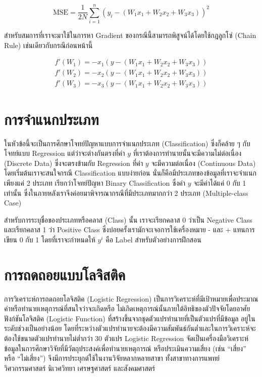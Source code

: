 \begin{equation}
    \text{MSE} = \frac{1}{2N} \sum_{i=1}^{n} (y_i - (W_1 x_1 + W_2 x_2 + W_3 x_3))^2
\end{equation}

สำหรับสมการที่เราจะมาใช้ในการหา Gradient ของกรณีนี้สามารถพิสูจน์ได้โดยใช้กฎลูกโซ่ (Chain Rule) เช่นเดียวกับกรณีก่อนหน้านี้

\begin{align}
    f'(W_1) = -x_1(y - (W_1 x_1 + W_2 x_2 + W_3 x_3)) \\
    f'(W_2) = -x_2(y - (W_1 x_1 + W_2 x_2 + W_3 x_3)) \\
    f'(W_3) = -x_3(y - (W_1 x_1 + W_2 x_2 + W_3 x_3))
\end{align}

\section{การจำแนกประเภท}
\label{sec:classification}

ในหัวข้อนี้จะเป็นการศึกษาโจทย์ปัญหาแบบการจำแนกประเภท (Classification) ซึ่งก็คล้าย ๆ กับโจทย์แบบ Regression แต่ว่าจะต่างกันตรงที่ค่า
$y$ ที่เราต้องการทำนายนั้นจะมีความไม่ต่อเนื่อง (Discrete Data) ซึ่งจะตรงข้ามกับ Regression ที่ค่า $y$ จะมีความต่อเนื่อง (Continuous 
Data) โดยเริ่มต้นเราจะสนใจกรณี Classification แบบง่ายก่อน นั่นก็คือมีประเภทของข้อมูลที่เราจะจำแนกเพียงแค่ 2 ประเภท เรียกว่าโจทย์ปัญหา 
Binary Classification ซึ่งค่า $y$ จะมีค่าได้แค่ 0 กับ 1 เท่านั้น ซึ่งในภายหลังเราจึงค่อยมาพิจารณากรณีที่มีประเภทมากกว่า 2 ประเภท
(Multiple-class Case) 

สำหรับการระบุชื่อของประเภทหรือคลาส (Class) นั้น เราจะเรียกคลาส 0 ว่าเป็น Negative Class และเรียกคลาส 1 ว่า Positive Class
ซึ่งบ่อยครั้งเรามักจะเจอการใช้เครื่องหมาย - และ + แทนการเขียน 0 กับ 1 โดยที่เราจะกำหนดให้ $y^{i}$ คือ Label สำหรับตัวอย่างการฝึกสอน

\section{การถดถอยแบบโลจิสติค}
\label{sec:logis_regress}

การวิเคราะห์การถดถอยโลจิสติค (Logistic Regression) เป็นการวิเคราะห์ที่มีเป้าหมายเพื่อประมาณค่าหรือทํานายเหตุการณ์ที่สนใจว่าจะเกิดหรือ%
ไม่เกิดเหตุการณ์นั้นภายใต้อิทธิของตัวปัจจัยโดยอาศัยฟังก์ชันโลจิสติค (Logistic Function) ที่สร้างขึ้นจากชุดตัวแปรทำนายที่เป็นตัวแปรที่มีข้อมูล%
อยู่ในระดับช่วงเป็นอย่างน้อย โดยที่ระหว่างตัวแปรทำนายจะต้องมีความสัมพันธ์กันต่ำและในการวิเคราะห์จะต้องใช้ขนาดตัวแปรทำนายไม่ต่ำกว่า 30 
ตัวแปร Logistic Regression จัดเป็นเครื่องมือวิเคราะห์ข้อมูลในการศึกษาวิจัยที่มีวัตถุประสงค์เพื่อทํานายเหตุการณ์ หรือประเมินความเสี่ยง (เช่น 
\enquote{เสี่ยง} หรือ \enquote{ไม่เสี่ยง}) จึงมีการประยุกต์ใช้ในงานวิจัยหลากหลายสาขา ทั้งสาขาทางการแพทย์ วิศวกรรมศาสตร์ นิเวศวิทยา 
เศรษฐศาสตร์ และสังคมศาสตร์


